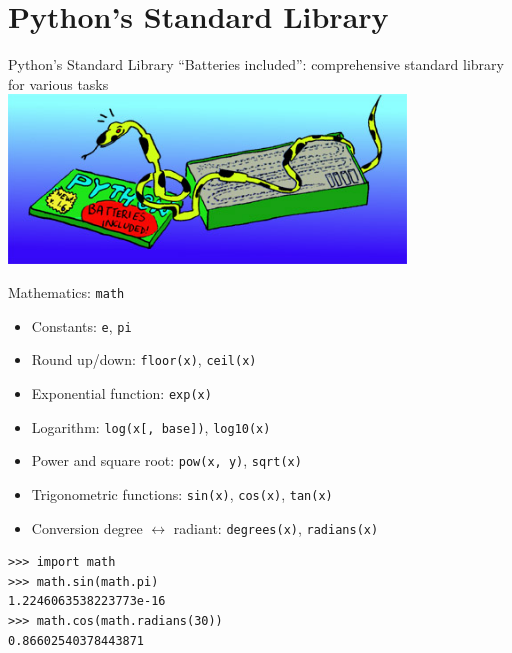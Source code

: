 \section{Python's Standard Library}

\begin{frame}{Python's Standard Library}
\alert{``Batteries included''}: comprehensive standard library for various tasks\\[4mm]

\includegraphics[height=4.5cm]{images/batteries_included.jpg}
\end{frame}

\begin{frame}[fragile]{Mathematics: \texttt{math}}
\begin{itemize}
\item Constants: \texttt{e}, \texttt{pi}
\item Round up/down: \texttt{floor(x)}, \texttt{ceil(x)}
\item Exponential function: \texttt{exp(x)}
\item Logarithm: \texttt{log(x[, base])}, \texttt{log10(x)}
\item Power and square root: \texttt{pow(x, y)}, \texttt{sqrt(x)}
\item Trigonometric functions: \texttt{sin(x)}, \texttt{cos(x)}, \texttt{tan(x)}
\item Conversion degree $\leftrightarrow$ radiant: \texttt{degrees(x)}, \texttt{radians(x)}
\end{itemize}
\begin{lstlisting}[style=Shell]
>>> import math
>>> math.sin(math.pi)
1.2246063538223773e-16
>>> math.cos(math.radians(30))
0.86602540378443871
\end{lstlisting}
\end{frame}


